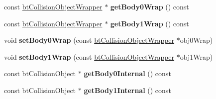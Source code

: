 \begin{DoxyCompactItemize}
\item 
\hypertarget{classbt_manifold_result_a29ec6c4571310ecdafa537ce1138f1cd}{const \hyperlink{structbt_collision_object_wrapper}{bt\+Collision\+Object\+Wrapper} $\ast$ {\bfseries get\+Body0\+Wrap} () const }\label{classbt_manifold_result_a29ec6c4571310ecdafa537ce1138f1cd}

\item 
\hypertarget{classbt_manifold_result_a8da30c98ee3311465509c03cdc1a2579}{const \hyperlink{structbt_collision_object_wrapper}{bt\+Collision\+Object\+Wrapper} $\ast$ {\bfseries get\+Body1\+Wrap} () const }\label{classbt_manifold_result_a8da30c98ee3311465509c03cdc1a2579}

\item 
\hypertarget{classbt_manifold_result_a0599942ca5ec1ddf5ea914ce734ba272}{void {\bfseries set\+Body0\+Wrap} (const \hyperlink{structbt_collision_object_wrapper}{bt\+Collision\+Object\+Wrapper} $\ast$obj0\+Wrap)}\label{classbt_manifold_result_a0599942ca5ec1ddf5ea914ce734ba272}

\item 
\hypertarget{classbt_manifold_result_a6fd0c696483fd32ab5def0785a9dbc12}{void {\bfseries set\+Body1\+Wrap} (const \hyperlink{structbt_collision_object_wrapper}{bt\+Collision\+Object\+Wrapper} $\ast$obj1\+Wrap)}\label{classbt_manifold_result_a6fd0c696483fd32ab5def0785a9dbc12}

\item 
\hypertarget{classbt_manifold_result_a1b51c62f11263f1530abe8ec8b658e3e}{const bt\+Collision\+Object $\ast$ {\bfseries get\+Body0\+Internal} () const }\label{classbt_manifold_result_a1b51c62f11263f1530abe8ec8b658e3e}

\item 
\hypertarget{classbt_manifold_result_a0e36efe4b028a0bd63f1c4b1e478a39e}{const bt\+Collision\+Object $\ast$ {\bfseries get\+Body1\+Internal} () const }\label{classbt_manifold_result_a0e36efe4b028a0bd63f1c4b1e478a39e}

\end{DoxyCompactItemize}
